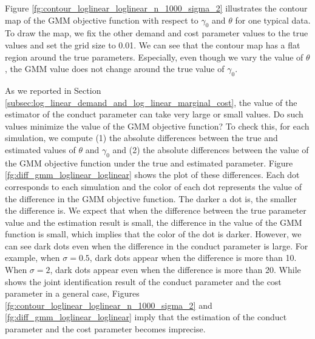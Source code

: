 \documentclass[11pt, a4paper]{article}
\begin{document}
Figure \ref{fg:contour_loglinear_loglinear_n_1000_sigma_2} illustrates the contour map of the GMM objective function with respect to $\gamma_0$ and $\theta$ for one typical data.
To draw the map, we fix the other demand and cost parameter values to the true values and set the grid size to 0.01.
We can see that the contour map has a flat region around the true parameters.
Especially, even though we vary the value of $\theta$, the GMM value does not change around the true value of $\gamma_0$.

As we reported in Section \ref{subsec:log_linear_demand_and_log_linear_marginal_cost}, the value of the estimator of the conduct parameter can take very large or small values.
Do such values minimize the value of the GMM objective function?
To check this, for each simulation, we compute (1) the absolute differences between the true and estimated values of $\theta$ and $\gamma_0$ and (2) the absolute differences between the value of the GMM objective function under the true and estimated parameter.
Figure \ref{fg:diff_gmm_loglinear_loglinear} shows the plot of these differences. 
Each dot corresponds to each simulation and the color of each dot represents the value of the difference in the GMM objective function. 
The darker a dot is, the smaller the difference is.
We expect that when the difference between the true parameter value and the estimation result is small, the difference in the value of the GMM function is small, which implies that the color of the dot is darker. 
However, we can see dark dots even when the difference in the conduct parameter is large.
For example, when $\sigma = 0.5$, dark dots appear when the difference is more than 10.
When $\sigma = 2$, dark dots appear even when the difference is more than 20.
While \citet{lau1982identifying} shows the joint identification result of the conduct parameter and the cost parameter in a general case, Figures \ref{fg:contour_loglinear_loglinear_n_1000_sigma_2} and \ref{fg:diff_gmm_loglinear_loglinear} imply that the estimation of the conduct parameter and the cost parameter becomes imprecise.
\end{document}
